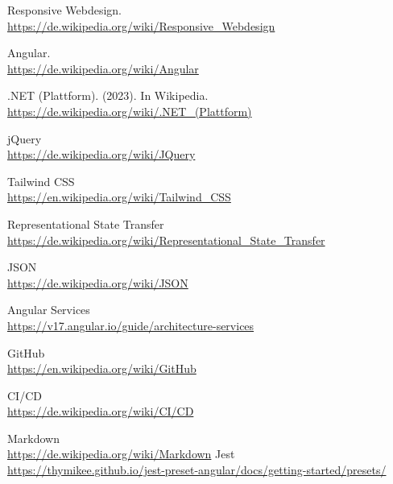 \documentclass[a4paper,11pt]{article}
\begin{document}
\begin{thebibliography}{99}
   Responsive Webdesign. \\
  \url{https://de.wikipedia.org/wiki/Responsive_Webdesign}
  
   Angular.\\
  \url{https://de.wikipedia.org/wiki/Angular}
  
   .NET (Plattform). (2023). In Wikipedia. \\
  \url{https://de.wikipedia.org/wiki/.NET_(Plattform)}
  
   jQuery \\
  \url{https://de.wikipedia.org/wiki/JQuery}
  
   Tailwind CSS \\
  \url{https://en.wikipedia.org/wiki/Tailwind_CSS}
  
   Representational State Transfer \\
  \url{https://de.wikipedia.org/wiki/Representational_State_Transfer}
  
   JSON\\
  \url{https://de.wikipedia.org/wiki/JSON}
  
   Angular Services \\
  \url{https://v17.angular.io/guide/architecture-services}
  
   GitHub \\
  \url{https://en.wikipedia.org/wiki/GitHub}
  
   CI/CD \\
  \url{https://de.wikipedia.org/wiki/CI/CD}
  
   Markdown \\
  \url{https://de.wikipedia.org/wiki/Markdown}
     Jest \\
  \url{https://thymikee.github.io/jest-preset-angular/docs/getting-started/presets/}
\end{thebibliography}
\end{document}
